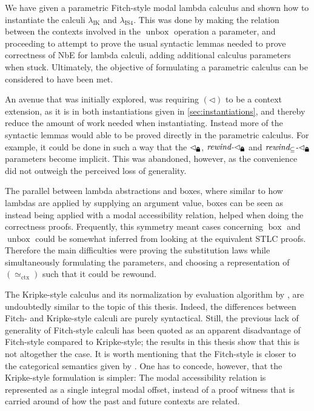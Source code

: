 \documentclass[12pt,twoside,openright]{report}
\numberwithin{equation}{chapter}
\numberwithin{figure}{chapter}
\numberwithin{table}{chapter}
\theoremstyle{definition}\newtheorem{definition}{Definition}
\newcommand{\lock}{\text{\tikz[baseline]{
      \fill[rounded corners=.1ex] (-.75ex,0) rectangle (.75ex,1ex);
      \draw[line width=.3ex] (-.4ex,.5ex) -- ++(0,.75ex) arc (180:0:.4ex) -- ++(0,-.75ex);
}}}
\begin{document}
We have given a parametric Fitch-style modal lambda calculus
and shown how to instantiate the calculi $\lambda_\text{IK}$ and $\lambda_\text{IS4}$.
This was done by making the relation between
the contexts involved in the $\operatorname{unbox}$ operation a parameter,
and proceeding to attempt to prove the usual syntactic lemmas
needed to prove correctness of NbE for lambda calculi,
adding additional calculus parameters when stuck.
Ultimately, the objective of formulating a parametric calculus
can be considered to have been met.

An avenue that was initially explored, was requiring $(\lhd)$ to be a context extension,
as it is in both instantiations given in \autoref{sec:instantiations},
and thereby reduce the amount of work needed when instantiating.
Instead more of the syntactic lemmas would able to be proved
directly in the parametric calculus.
For example, it could be done in such a way that the
$\lhd_\lock$, $\textit{rewind-$\lhd_\lock$}$ and $\textit{rewind$_\subseteq$-$\lhd_\lock$}$
parameters become implicit.
This was abandoned, however,
as the convenience did not outweigh the perceived loss of generality.

The parallel between lambda abstractions and boxes,
where similar to how lambdas are applied by supplying an argument value,
boxes can be seen as instead being applied with a modal accessibility relation,
helped when doing the correctness proofs.
Frequently,
this symmetry meant cases concerning $\operatorname{box}$ and $\operatorname{unbox}$
could be somewhat inferred from looking at the equivalent STLC proofs.
Therefore the main difficulties were
proving the substitution laws while simultaneously formulating the parameters,
and choosing a representation of $(\simeq_\text{ctx})$ such that it could be rewound.

The Kripke-style calculus and its normalization by evaluation algorithm by \textcite{hu23},
are undoubtedly similar to the topic of this thesis.
Indeed, the differences between Fitch- and Kripke-style calculi are purely syntactical.
Still, the previous lack of generality of Fitch-style calculi has been quoted \cite{hu18}
as an apparent disadvantage of Fitch-style compared to Kripke-style;
the results in this thesis show that this is not altogether the case.
It is worth mentioning that the Fitch-style is closer to the
categorical semantics given by \textcite{clouston18}.
One has to concede, however, that the Kripke-style formulation is simpler:
The modal accessibility relation is represented as a single integral modal offset,
instead of a proof witness that is carried around of how the past and future contexts are related.
\end{document}
